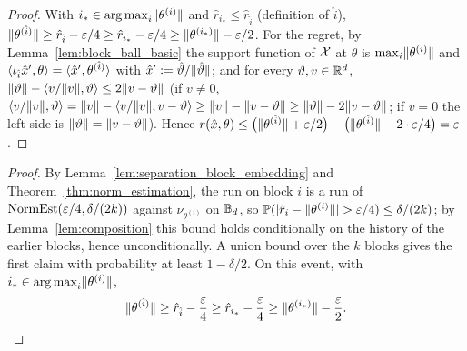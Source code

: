 \begin{proof}
\leanok
{}
With $i_* \in \operatorname*{arg\,max}_i\lVert \theta^{(i)} \rVert$ and $\hat r_{i_*} \le \hat r_{\hat i}$ (definition of
$\hat i$),
$\lVert \theta^{(\hat i)} \rVert \ge \hat r_{\hat i} - \varepsilon/4 \ge \hat r_{i_*} - \varepsilon/4
\ge \lVert \theta^{(i_*)} \rVert - \varepsilon/2$. For the regret, by Lemma~\ref{lem:block_ball_basic} the
support function of $\mathcal{X}$ at $\theta$ is $\max_i\lVert \theta^{(i)} \rVert$ and
$\langle \iota_{\hat i}\hat{x}', \theta \rangle = \langle \hat{x}', \theta^{(\hat i)} \rangle$ with
$\hat{x}' := \hat\vartheta/\lVert \hat\vartheta \rVert$; and for every $\vartheta, v \in \mathbb{R}^d$,
$\lVert \vartheta \rVert - \langle v/\lVert v \rVert, \vartheta \rangle \le 2\lVert v - \vartheta \rVert$ (if $v \ne 0$,
$\langle v/\lVert v \rVert, \vartheta \rangle = \lVert v \rVert - \langle v/\lVert v \rVert, v - \vartheta \rangle \ge \lVert v \rVert - \lVert v - \vartheta \rVert
\ge \lVert \vartheta \rVert - 2\lVert v - \vartheta \rVert$; if $v = 0$ the left side is
$\lVert \vartheta \rVert = \lVert v - \vartheta \rVert$). Hence
$r(\hat{x},\theta) \le \big(\lVert \theta^{(\hat i)} \rVert + \varepsilon/2\big) - \big(\lVert \theta^{(\hat i)} \rVert - 2\cdot\varepsilon/4\big) = \varepsilon$.
\end{proof}

\begin{proof}
By Lemma~\ref{lem:separation_block_embedding} and Theorem~\ref{thm:norm_estimation}, the
run on block $i$ is a run of $\mathrm{NormEst}(\varepsilon/4,\delta/(2k))$ against $\nu_{\theta^{(i)}}$ on
$\mathbb{B}_d$, so $\mathbb{P}(|\hat r_i - \lVert \theta^{(i)} \rVert| > \varepsilon/4) \le \delta/(2k)$; by
Lemma~\ref{lem:composition} this bound holds conditionally on the history of the earlier
blocks, hence unconditionally. A union bound over the $k$ blocks gives the first claim with
probability at least $1 - \delta/2$. On this event, with $i_* \in \operatorname*{arg\,max}_i\lVert \theta^{(i)} \rVert$,
\[
  \lVert \theta^{(\hat i)} \rVert \ge \hat r_{\hat i} - \frac{\varepsilon}4 \ge \hat r_{i_*} - \frac{\varepsilon}4
  \ge \lVert \theta^{(i_*)} \rVert - \frac{\varepsilon}2 .
\]
\end{proof}

